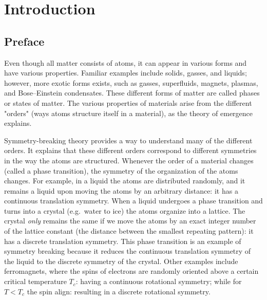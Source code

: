 \chapter{Introduction}
\label{ch:introduction}

\section{Preface}

Even though all matter consists of atoms, it can appear in various forms and have various properties.
Familiar examples include solids, gasses, and liquids; however, more exotic forms exists, such as gasses, superfluids, magnets, plasmas, and Bose–Einstein condensates.
These different forms of matter are called phases or states of matter.
The various properties of materials arise from the different "orders" (ways atoms structure itself in a material), as the theory of emergence explains.

Symmetry-breaking theory provides a way to understand many of the different orders.
It explains that these different orders correspond to different symmetries in the way the atoms are structured.
Whenever the order of a material changes (called a phase transition), the symmetry of the organization of the atoms changes.
For example, in a liquid the atoms are distributed randomly, and it remains a liquid upon moving the atoms by an arbitrary distance: it has a continuous translation symmetry.
When a liquid undergoes a phase transition and turns into a crystal (e.g.~water to ice) the atoms organize into a lattice.
The crystal \textit{only} remains the same if we move the atoms by an exact integer number of the lattice constant (the distance between the smallest repeating pattern): it has a discrete translation symmetry.
This phase transition is an example of symmetry breaking because it reduces the continuous translation symmetry of the liquid to the discrete symmetry of the crystal.
Other examples include ferromagnets, where the spins of electrons are randomly oriented above a certain critical temperature $T_c$: having a continuous rotational symmetry; while for $T<T_c$ the spin align: resulting in a discrete rotational symmetry.

